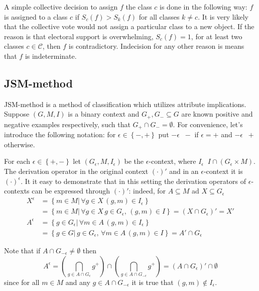\documentclass[a4paper]{article}
\newcommand{\obj}[1]{{\left\{ #1 \right \}}}
\newcommand{\brac}[1]{{\left ( #1 \right )}}
\newcommand{\induc}[1]{{\left . #1 \right \vert}}
\newcommand{\defn}{\mathop{\overset{\Delta}{=}}\nolimits}
\begin{document}
A simple collective decision to assign $f$ the class $c$ is done in the following way: $f$ is assigned to a class $c$ if $S_c(f) > S_k(f)$ for all classes $k\neq c$. It is very likely that the collective vote would not assign a particular class to a new object. If the reason is that electoral support is overwhelming, $S_c(f)=1$, for at least two classes $c\in \mathcal{C}$, then $f$ is contradictory. Indecision for any other reason is means that $f$ is indeterminate.


\subsection{JSM-method} %
\label{sub:jsm_method}

JSM-method is a method of classification which utilizes attribute implications. Suppose $(G,M,I)$ is a binary context and $G_+,G_-\subseteq G$ are known positive and negative examples respectively, such that $G_+\cap G_- = \emptyset$. For convenience, let's introduce the following notation: for $\epsilon\in \obj{-,+}$ put $-\epsilon \defn -$ if $\epsilon=+$ and $-\epsilon \defn +$ otherwise.

For each $\epsilon \in \obj{+,-}$ let $(G_\epsilon,M,I_\epsilon)$ be the $\epsilon$-context, where $I_\epsilon \defn I\cap (G_\epsilon\times M)$. The derivation operator in the original context ${(\cdot)}'$ and in an $\epsilon$-context it is ${(\cdot)}^\epsilon$. It it easy to demonstrate that in this setting the derivation operators of $\epsilon$-contexts can be expressed through ${(\cdot)}'$: indeed, for $A\subseteq M$ ad $X\subseteq G_\epsilon$ \begin{align*}
	X^\epsilon &= \obj{\induc{ m\in M }\, \forall g\in X\,(g,m)\in I_\epsilon} \\ &= \obj{\induc{ m\in M }\, \forall g\in X\,g\in G_\epsilon,\,(g,m)\in I} = \brac{X\cap G_\epsilon}' = X'\\
	A^\epsilon &= \obj{\induc{ g\in G_\epsilon }\, \forall m\in A\,(g,m)\in I_\epsilon} \\ &= \obj{\induc{ g\in G }\,g\in G_\epsilon,\, \forall m\in A\,(g,m)\in I} = A' \cap G_\epsilon
\end{align*}

Note that if $A\cap G_{-\epsilon} \neq \emptyset$ then \[A^\epsilon = \brac{ \bigcap_{g\in A\cap G_\epsilon} g^+ }\cap \brac{ \bigcap_{g\in A\cap G_{-\epsilon}} g^+ } = \brac{A\cap G_\epsilon}' \cap \emptyset\] since for all $m\in M$ and any $g\in A\cap G_{-\epsilon}$ it is true that $(g,m)\notin I_\epsilon$.
\end{document}
